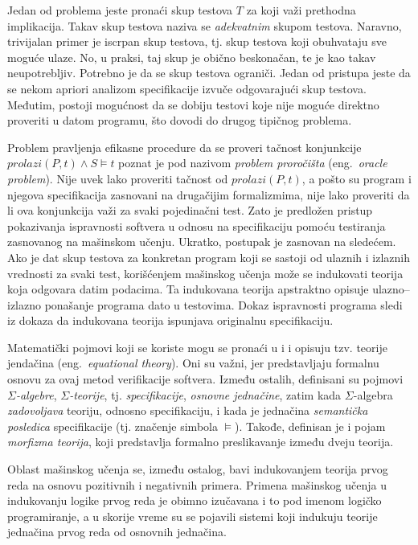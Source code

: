 \documentclass[a4paper]{article}
\theoremstyle{definition}
\begin{document}
{\par Jedan od problema jeste pronaći skup testova $T$ za koji važi prethodna implikacija. Takav skup testova naziva se \emph{adekvatnim} skupom testova. Naravno, trivijalan primer je iscrpan skup testova, tj. skup testova koji obuhvataju sve moguće ulaze. No, u praksi, taj skup je obično beskonačan, te je kao takav neupotrebljiv. Potrebno je da se skup testova ograniči. Jedan od pristupa jeste da se nekom apriori analizom specifikacije izvuče odgovarajući skup testova. Međutim, postoji mogućnost da se dobiju testovi koje nije moguće direktno proveriti u datom programu, što dovodi do drugog tipičnog problema.

\par Problem pravljenja efikasne procedure da se proveri tačnost konjunkcije $prolazi(P,t)\wedge S\models t$ poznat je pod nazivom \emph{problem proročišta} (eng.~{\em oracle problem}). Nije uvek lako proveriti tačnost od $prolazi(P,t)$, a pošto su program i njegova specifikacija zasnovani na drugačijim formalizmima, nije lako proveriti da li ova konjunkcija važi za svaki pojedinačni test. Zato je predložen pristup pokazivanja ispravnosti softvera u odnosu na specifikaciju pomoću testiranja zasnovanog na mašinskom učenju. Ukratko, postupak je zasnovan na sledećem. Ako je dat skup testova za konkretan program koji se sastoji od ulaznih i izlaznih vrednosti za svaki test, korišćenjem mašinskog učenja može se indukovati teorija koja odgovara datim podacima. Ta indukovana teorija apstraktno opisuje ulazno--izlazno ponašanje programa dato u testovima. Dokaz ispravnosti programa sledi iz dokaza da indukovana teorija ispunjava originalnu specifikaciju.

\par Matematički pojmovi koji se koriste mogu se pronaći u \cite{verify} i \cite{equationaltheory} i opisuju tzv. teorije jendačina (eng.~{\em equational theory}). Oni su važni, jer predstavljaju formalnu osnovu za ovaj metod verifikacije softvera. Između ostalih, definisani su pojmovi \emph{$\Sigma$-algebre}, \emph{$\Sigma$-teorije}, tj. \emph{specifikacije}, \emph{osnovne jednačine}, zatim kada $\Sigma$-algebra \emph{zadovoljava} teoriju, odnosno specifikaciju, i kada je jednačina \emph{semantička posledica} specifikacije (tj. značenje simbola $\models$). Takođe, definisan je i pojam \emph{morfizma teorija}, koji predstavlja formalno preslikavanje između dveju teorija.

\par Oblast mašinskog učenja se, između ostalog, bavi indukovanjem teorija prvog reda na osnovu pozitivnih i negativnih primera. Primena mašinskog učenja u indukovanju logike prvog reda je obimno izučavana i to pod imenom logičko programiranje, a u skorije vreme su se pojavili sistemi koji indukuju teorije jednačina prvog reda od osnovnih jednačina.

}
\end{document}
